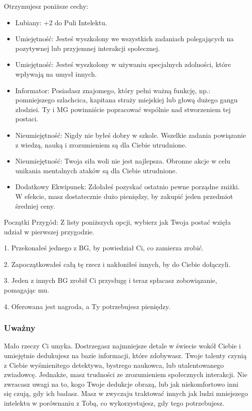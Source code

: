 Otrzymujesz poniższe cechy:
\begin{itemize}
    \item Lubiany: +2 do Puli Intelektu.
    \item  Umiejętność: Jesteś wyszkolony we wszystkich zadaniach polegających na pozytywnej lub przyjemnej interakcji społecznej.
    \item Umiejętność: Jesteś wyszkolony w używaniu specjalnych zdolności, które wpływają na umysł innych.
    \item  Informator: Posiadasz znajomego, który pełni ważną funkcję, np.: pomniejszego szlachcica, kapitana straży miejskiej lub głową dużego gangu złodziei. Ty i MG powinniście popracować wspólnie nad stworzeniem tej postaci.
    \item  Nieumiejętność: Nigdy nie byłeś dobry w szkole. Wszelkie zadania powiązanie z wiedzą, nauką i zrozumieniem są dla Ciebie utrudnione.
    \item  Nieumiejętność: Twoja siła woli nie jest najlepsza. Obronne akcje w celu unikania mentalnych ataków są dla Ciebie utrudnione.
    \item  Dodatkowy Ekwipunek: Zdołałeś pozyskać ostatnio pewne porządne zniżki. W efekcie, masz dostatecznie dużo pieniędzy, by zakupić jeden przedmiot średniej ceny. 
\end{itemize}

Początki Przygód: Z listy poniższych opcji, wybierz jak Twoja postać wzięła udział w pierwszej przygodzie.

1. Przekonałeś jednego z BG, by powiedział Ci, co zamierza zrobić.

2. Zapoczątkowałeś całą tę rzecz i nakłoniłeś innych, by do Ciebie dołączyli.

3. Jeden z innych BG zrobił Ci przysługę i teraz spłacasz zobowiązanie, pomagając mu.

4. Oferowana jest nagroda, a Ty potrzebujesz pieniędzy.

\subsubsection{Uważny}

Mało rzeczy Ci umyka. Dostrzegasz najmniejsze detale w świecie wokół Ciebie i umiejętnie dedukujesz na bazie informacji, które zdobywasz. Twoje talenty czynią z Ciebie wyśmienitego detektywa, bystrego naukowca, lub utalentowanego zwiadowcę.
Jednakże, masz trudności ze zrozumieniem społecznych interakcji. Nie zwracasz uwagi na to, kogo Twoje dedukcje obrazą, lub jak niekomfortowo inni się czują, gdy ich badasz. Masz w zwyczaju traktować innych jak ludzi mniejszego intelektu w porównaniu z Tobą, co wykorzystujesz, gdy tego potrzebujesz.

